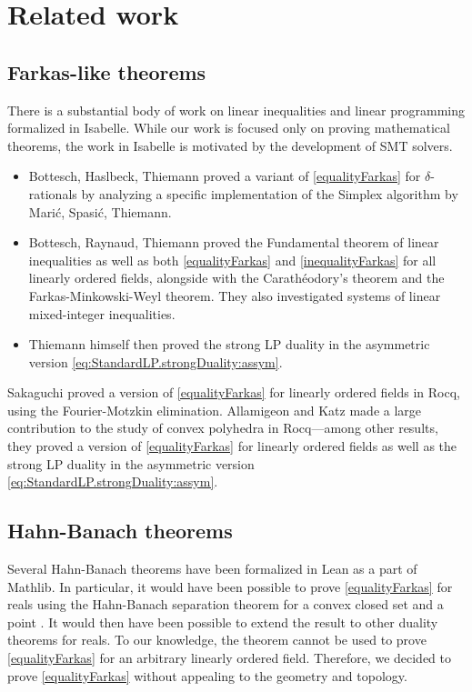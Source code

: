 \documentclass[]{article}
\renewcommand{\.}{\hskip .75pt}
\begin{document}
\section {Related work}

\subsection{Farkas-like theorems}

There is a substantial body of work on linear inequalities and
linear programming formalized in Isabelle.
While our work is focused only on proving mathematical theorems,
the work in Isabelle is motivated by the development of SMT solvers.

\begin{itemize}
\item 
Bottesch, Haslbeck, Thiemann \cite{Farkas-AFP} proved a variant of
\ref{equalityFarkas} for $\delta$-rationals
by analyzing a specific implementation of the Simplex algorithm
\cite{Simplex-AFP} by Marić, Spasić, Thiemann.
\item
Bottesch, Raynaud, Thiemann \cite{Linear-AFP} proved
the Fundamental theorem of linear inequalities as well
as both \ref{equalityFarkas} and \ref{inequalityFarkas}
for all linearly ordered fields, alongside with
the Carathéodory’s theorem and the Farkas-Minkowski-Weyl theorem.
They also investigated systems of linear mixed-integer inequalities.
\item 
Thiemann himself \cite{Duality-AFP} then proved the strong LP duality
in the asymmetric version \eqref{eq:StandardLP.strongDuality:assym}.
\end{itemize}

Sakaguchi \cite{Vass-Coq} proved a version of \ref{equalityFarkas}
for linearly ordered fields in Rocq, using the Fourier-Motzkin elimination.
Allamigeon and Katz \cite{Simplex-Coq} made a large contribution to
the study of convex polyhedra in Rocq\:---\:among
other results, they proved a version of \ref{equalityFarkas}
for linearly ordered fields as well as the strong LP duality
in the asymmetric version \eqref{eq:StandardLP.strongDuality:assym}.

\subsection{Hahn-Banach theorems}

Several Hahn-Banach theorems have been formalized in Lean as a part of
Mathlib.
In particular, it would have been possible to prove \ref{equalityFarkas}
for reals using the Hahn-Banach separation theorem for a convex closed set
and a point \cite{HahnBanach-Lean}.
It would then have been possible to extend the result to other
duality theorems for reals.
To our knowledge, the theorem \cite{HahnBanach-Lean} cannot be used
to prove \ref{equalityFarkas} for an arbitrary linearly ordered field.
Therefore, we decided to prove \ref{equalityFarkas} without appealing to
the geometry and topology.
\end{document}
